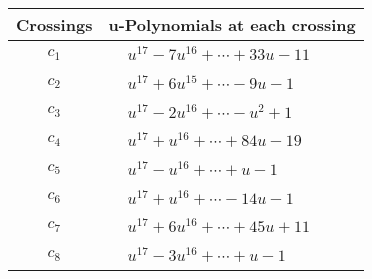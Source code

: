 \documentclass[1p]{elsarticle_modified}
\theoremstyle{definition}
\begin{document}
\begin{tabular}{m{50pt}|m{274pt}}
Crossings & \hspace{64pt}u-Polynomials at each crossing \\
\hline $$\begin{aligned}c_{1}\end{aligned}$$&$\begin{aligned}
&u^{17}-7 u^{16}+\cdots+33 u-11
\end{aligned}$\\
\hline $$\begin{aligned}c_{2}\end{aligned}$$&$\begin{aligned}
&u^{17}+6 u^{15}+\cdots-9 u-1
\end{aligned}$\\
\hline $$\begin{aligned}c_{3}\end{aligned}$$&$\begin{aligned}
&u^{17}-2 u^{16}+\cdots- u^2+1
\end{aligned}$\\
\hline $$\begin{aligned}c_{4}\end{aligned}$$&$\begin{aligned}
&u^{17}+u^{16}+\cdots+84 u-19
\end{aligned}$\\
\hline $$\begin{aligned}c_{5}\end{aligned}$$&$\begin{aligned}
&u^{17}- u^{16}+\cdots+u-1
\end{aligned}$\\
\hline $$\begin{aligned}c_{6}\end{aligned}$$&$\begin{aligned}
&u^{17}+u^{16}+\cdots-14 u-1
\end{aligned}$\\
\hline $$\begin{aligned}c_{7}\end{aligned}$$&$\begin{aligned}
&u^{17}+6 u^{16}+\cdots+45 u+11
\end{aligned}$\\
\hline $$\begin{aligned}c_{8}\end{aligned}$$&$\begin{aligned}
&u^{17}-3 u^{16}+\cdots+u-1
\end{aligned}$\\

\end{tabular}
\end{document}
